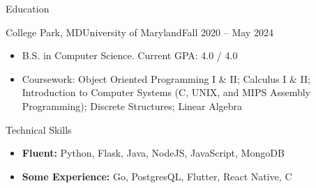 \documentclass[]{mcdowellcv}
\begin{document}
	\makeheader
	
	\begin{cvsection}{Education}
		\begin{cvsubsection}{College Park, MD}{University of Maryland}{Fall 2020 -- May 2024}
			\begin{itemize}
				\item B.S. in Computer Science. Current GPA: 4.0 / 4.0
				\item Coursework: Object Oriented Programming I \& II; Calculus I \& II; Introduction to Computer Systems (C, UNIX, and MIPS Assembly Programming); Discrete Structures; Linear Algebra
			\end{itemize}
		\end{cvsubsection}
	\end{cvsection}

	\begin{cvsection}{Technical Skills}
		\begin{cvsubsection}{}{}{}
			\vspace{0.5em}
			\begin{itemize}
				\item \textbf{Fluent:} Python, Flask, Java, NodeJS, JavaScript, MongoDB
				\item \textbf{Some Experience:} Go, PostgresQL, Flutter, React Native, C
			\end{itemize}		
		\end{cvsubsection}
	\end{cvsection}
\end{document}
